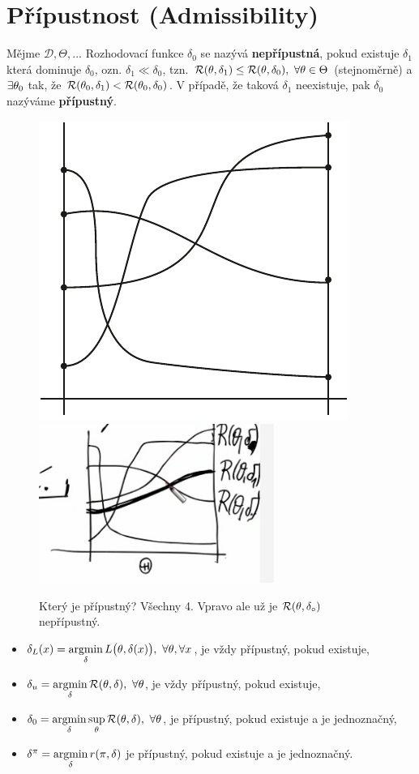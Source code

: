 \section{Přípustnost (Admissibility)}
\begin{define}
	Mějme $\mathscr{D},\Theta,...$ Rozhodovací funkce $\delta_0$ se nazývá \textbf{nepřípustná}, pokud existuje $\delta_1$ která dominuje $\delta_0$, ozn. $\delta_1\ll\delta_0$, tzn. $\mathcal{R}(\theta,\delta_1)\leq\mathcal{R}(\theta,\delta_0),~\forall\theta\in\Theta$ (stejnoměrně) a $\exists\theta_0$ tak, že $\mathcal{R}(\theta_0,\delta_1)<\mathcal{R}(\theta_0,\delta_0)$. V případě, že taková $\delta_1$ neexistuje, pak $\delta_0$ nazýváme \textbf{přípustný}.
	
	\begin{figure}[h]
		\centering
		\includegraphics[width=0.4\linewidth]{pictures/9_2}
		\includegraphics[width=0.4\linewidth]{pictures/9_3}
		\caption{Který je přípustný? Všechny 4. Vpravo ale už je $\mathcal{R}(\theta,\delta_\circ)$ nepřípustný.}
		\label{fig:92}
	\end{figure}
	
\end{define}
\begin{theorem}
	\begin{itemize}
		\item 
	$\delta_L(x)=\mathop{\mathrm{argmin}}\limits_\delta L\big(\theta,\delta(x)\big),~\forall\theta,\forall x$, je vždy přípustný, pokud existuje, \item  $\delta_u=\mathop{\mathrm{argmin}}\limits_\delta\mathcal{R}(\theta,\delta),~\forall\theta$, je vždy přípustný, pokud existuje, \item  $\delta_0=\mathop{\mathrm{argmin}}\limits_\delta\sup\limits_\theta\mathcal{R}(\theta,\delta),~\forall\theta$, je přípustný, pokud existuje a je jednoznačný, \item  $\delta^\pi=\mathop{\mathrm{argmin}}\limits_\delta r(\pi,\delta)$ je přípustný, pokud existuje a je jednoznačný.
\end{itemize}
\end{theorem}


